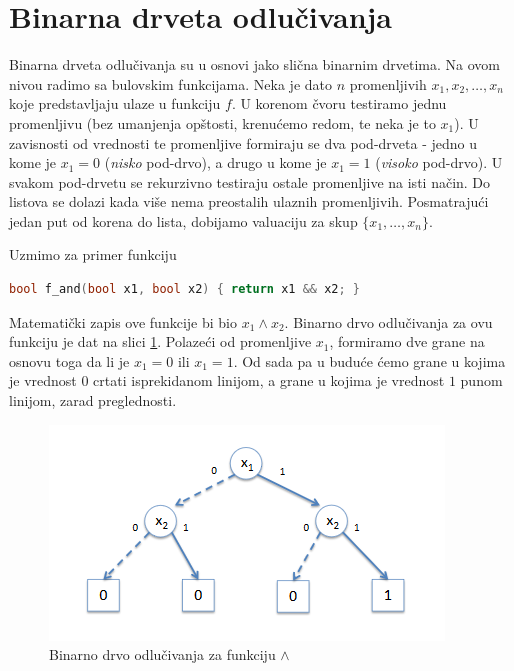 \section{Binarna drveta odlu\v{c}ivanja}
\label{sec:BinarnaDrvetaOdlucivanja}

Binarna drveta odlu\v{c}ivanja su u osnovi jako sli\v{c}na binarnim drvetima. Na ovom nivou radimo sa bulovskim funkcijama. Neka je dato $n$ promenljivih $x_{1}, x_{2}, \dots , x_{n}$ koje predstavljaju ulaze u funkciju $f$. U korenom \v{c}voru testiramo jednu promenljivu (bez umanjenja op\v{s}tosti, krenu\'c{}emo redom, te neka je to $x_{1}$). U zavisnosti od vrednosti te promenljive formiraju se dva pod-drveta - jedno u kome je $x_{1} = 0$ (\emph{nisko} pod-drvo), a drugo u kome je $x_{1} = 1$ (\emph{visoko} pod-drvo). U svakom pod-drvetu se rekurzivno testiraju ostale promenljive na isti na\v{c}in. Do listova se dolazi kada vi\v{s}e nema preostalih ulaznih promenljivih. Posmatraju\'c{}i jedan put od korena do lista, dobijamo valuaciju za skup $\{x_{1}, \dots , x_{n}\}$.

Uzmimo za primer funkciju

\begin{lstlisting}[language=C++,escapechar=@]
    bool f_and(bool x1, bool x2) { return x1 && x2; }
\end{lstlisting}

\noindent Matematički zapis ove funkcije bi bio $x_{1} \wedge x_{2}$. Binarno drvo odlu\v{c}ivanja za ovu funkciju je dat na slici \ref{diag:BDAnd}. Polaze\'c{}i od promenljive $x_{1}$, formiramo dve grane na osnovu toga da li je $x_{1} = 0$ ili $x_{1} = 1$. Od sada pa u budu\'c{}e \'c{}emo grane u kojima je vrednost $0$ crtati isprekidanom linijom, a grane u kojima je vrednost $1$ punom linijom, zarad preglednosti.

\begin{figure}[H]
    \centering
    \includegraphics[scale=0.8]{slike/BD_And.PNG}
    \caption{Binarno drvo odlu\v{c}ivanja za funkciju $\wedge$}
    \label{diag:BDAnd}
\end{figure}

